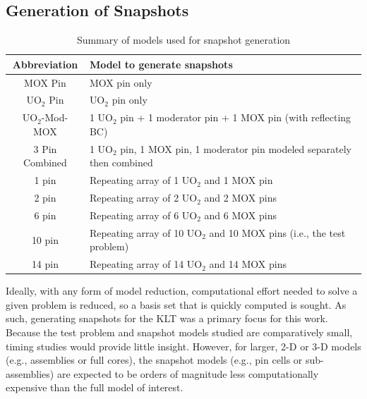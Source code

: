 \documentclass{anstrans}
\begin{document}
\subsection{Generation of Snapshots}

\begin{table}
  \centering
  \caption{Summary of models used for snapshot generation}
  \begin{tabular}{c | l}\toprule
    Abbreviation    & Model to generate snapshots \\ \midrule
    MOX Pin         & MOX pin only \\
    UO$_2$ Pin      & UO$_2$ pin only \\
    UO$_2$-Mod-MOX  & 1 UO$_2$ pin + 1 moderator pin + 1 MOX pin (with reflecting BC) \\
    3 Pin Combined  & 1 UO$_2$ pin, 1 MOX pin, 1 moderator pin modeled separately then combined \\
    1 pin           & Repeating array of 1 UO$_2$ and 1 MOX pin \\
    2 pin           & Repeating array of 2 UO$_2$ and 2 MOX pins \\
    6 pin           & Repeating array of 6 UO$_2$ and 6 MOX pins \\
    10 pin          & Repeating array of 10 UO$_2$ and 10 MOX pins (i.e., the test problem)\\
    14 pin          & Repeating array of 14 UO$_2$ and 14 MOX pins \\
    \bottomrule
  \end{tabular}
  \label{tab:snapshots}
\end{table}

Ideally, with any form of model reduction, computational effort needed to solve a given problem is reduced, so a basis set that is quickly computed is sought. As such, generating snapshots for the KLT was a primary focus for this work.  Because the test problem and snapshot models studied are comparatively small, timing studies would provide little insight.  However, for larger, 2-D or 3-D models (e.g.,
assemblies or full cores), the snapshot models (e.g., pin cells or sub-assemblies) are expected to be orders of magnitude less computationally expensive than the full model of interest.
\end{document}
